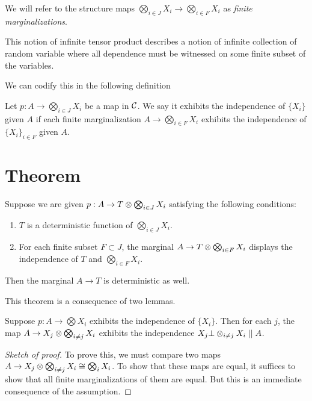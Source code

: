 \documentclass{article}
\begin{document}
We will refer to the structure maps $\bigotimes_{i\in J} X_i \to \bigotimes_{i\in F} X_i$ as \emph{finite marginalizations}.

This notion of infinite tensor product describes a notion of infinite collection of random variable where all dependence must be witnessed on some finite subset of the variables.

We can codify this in the following definition
\begin{definition}
    Let $p: A \to \bigotimes_{i\in J}X_i$ be a map in $\mathcal{C}$.
    We say it exhibits the independence of $\{X_i\}$ given $A$ if each finite marginalization $A \to \bigotimes_{i \in F}X_i$ exhibits the independence of $\{X_i\}_{i \in F}$ given $A$.
\end{definition}

\section{Theorem}
\begin{theorem}
    Suppose we are given $p: A \to T \otimes \bigotimes_{i \in J} X_i$ satisfying the following conditions:
    \begin{enumerate}
        \item $T$ is a deterministic function of $\bigotimes_{i \in J} X_i$.
        \item For each finite subset $F \subset J$, the marginal $A \to T \otimes \bigotimes_{i \in F}X_i$ displays the independence of $T$ and $\bigotimes_{i \in F} X_i$.
    \end{enumerate}
    Then the marginal $A \to T$ is deterministic as well.
\end{theorem}

This theorem is a consequence of two lemmas.
\begin{lemma}
    Suppose $p: A \to \bigotimes X_i$ exhibits the independence of $\{X_i\}$.
    Then for each $j$, the map $A \to X_j \otimes \bigotimes_{i \neq j}X_i$ exhibits the independence $X_j \bot \otimes_{i\neq j} X_i \mid \mid A$.
\end{lemma}
\begin{proof}[Sketch of proof]
    To prove this, we must compare two maps $A \to X_j \otimes \bigotimes_{i\neq j} X_i \cong \bigotimes_i X_i$.
    To show that these maps are equal, it suffices to show that all finite marginalizations of them are equal.
    But this is an immediate consequence of the assumption.
\end{proof}
\end{document}

